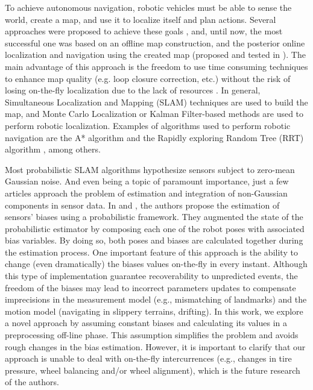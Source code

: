 To achieve autonomous navigation, robotic vehicles must be able to sense the world, create a map, and use it to localize itself and plan actions. Several approaches were proposed to achieve these goals \cite{07durrant2006simultaneous,08weingarten2005ekf,09williams2001efficient,10thrun2006graph,11dissanayake2002map,12duckett2000learning}, and, until now, the most successful one was based on an offline map construction, and the posterior online localization and navigation using the created map (proposed and tested in \cite{13levinson2007map}). The main advantage of this approach is the freedom to use time consuming techniques to enhance map quality (e.g. loop closure correction, etc.) without the risk of losing on-the-fly localization due to the lack of resources \cite{10thrun2006graph}. In general, Simultaneous Localization and Mapping (SLAM) techniques are used to build the map, and Monte Carlo Localization  \cite{14thrun2001robust} or Kalman Filter-based methods \cite{15roumeliotis2000bayesian} are used to perform robotic localization. Examples of algorithms used to perform robotic navigation are the A* algorithm \cite{16likhachev2005anytime} and the Rapidly exploring Random Tree (RRT) algorithm \cite{17lavalle2000rapidly}, among others.

Most probabilistic SLAM algorithms hypothesize sensors subject to zero-mean Gaussian noise. And even being a topic of paramount importance, just a few articles approach the problem of estimation and integration of non-Gaussian components in sensor data. In \cite{31kummerle2013state} and \cite{20perera2003sensor}, the authors propose the estimation of sensors' biases using a probabilistic framework. They augmented the state of the probabilistic estimator by composing each one of the robot poses with associated bias variables. By doing so, both poses and biases are calculated together during the estimation process. One important feature of this approach is the ability to change (even dramatically) the biases values on-the-fly in every instant. Although this type of implementation guarantee recoverability to unpredicted events, the freedom of the biases may lead to incorrect parameters updates to compensate imprecisions in the measurement model (e.g., mismatching of landmarks) and the motion model (navigating in slippery terrains, drifting). In this work, we explore a novel approach by assuming constant biases and calculating its values in a preprocessing off-line phase. This assumption simplifies the problem and avoids rough changes in the bias estimation. However, it is important to clarify that our approach is unable to deal with on-the-fly intercurrences (e.g., changes in tire pressure, wheel balancing and/or wheel alignment), which is the future research of the authors.

